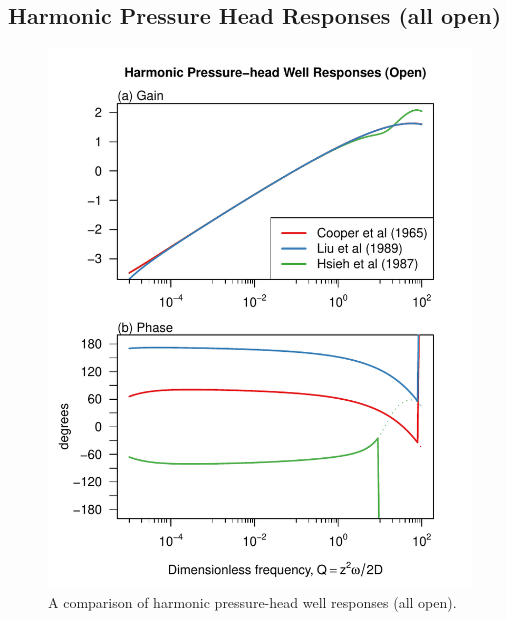 \documentclass[10pt]{article}\usepackage[]{graphicx}\usepackage[]{color}
\makeatletter
\def\maxwidth{ %
  \ifdim\Gin@nat@width>\linewidth
    \linewidth
  \else
    \Gin@nat@width
  \fi
}
\newenvironment{knitrout}{}{} %
\makeatother
\begin{document}
\subsection{Harmonic Pressure Head Responses (all open)}
\begin{figure}[htb!]
\begin{center}
\begin{knitrout}
\color{fgcolor}
\includegraphics[width=\maxwidth]{figure/ALLORESPFIG} 

\end{knitrout}

\caption{A comparison of harmonic pressure-head well responses (all open).}
\label{fig:owrsp-all}
\end{center}
\end{figure}




\printindex
\end{document}
